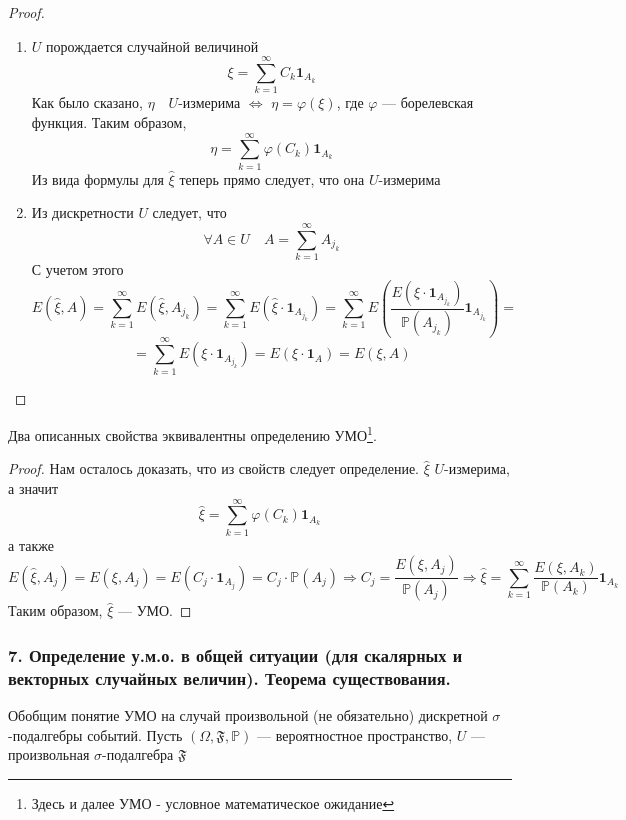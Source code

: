 \documentclass[12pt, russian]{article}
\begin{document}
\begin{proof}
$ $
\begin{enumerate}
\item
$U$ порождается случайной величиной 
$$ \xi = \sum\limits_{k=1}^{\infty}{C_k \mathbf{1}_{A_k}}$$
Как было сказано, $\eta\quad U$-измерима $\Leftrightarrow$ $\eta = \varphi(\xi)$, где $\varphi$ --- борелевская функция. Таким образом,
$$ \eta = \sum\limits_{k=1}^{\infty}{\varphi(C_k) \mathbf{1}_{A_k}} $$
Из вида формулы для $\hat{\xi}$ теперь прямо следует, что она $U$-измерима
\item Из дискретности $U$ следует, что
$$ \forall A \in U \quad A = \sum\limits_{k=1}^{\infty}{A_{j_k}} $$
С учетом этого
$$ E(\hat{\xi}, A) = \sum\limits_{k=1}^{\infty}{E(\hat{\xi}, A_{j_k})} = \sum\limits_{k=1}^{\infty}{E(\hat{\xi}\cdot\mathbf{1}_{A_{j_k}})} = \sum\limits_{k=1}^{\infty}{E\left( \frac{E(\xi\cdot\mathbf{1}_{A_{j_k}})}{\mathbb{P}(A_{j_k})} \mathbf{1}_{A_{j_k}} \right)} = $$ 
$$ = \sum\limits_{k=1}^{\infty}{E(\xi\cdot\mathbf{1}_{A_{j_k}})} = E(\xi \cdot \mathbf{1}_A) = E(\xi, A) $$
\end{enumerate}
\end{proof}
\newpage
\begin{lemma}
Два описанных свойства эквивалентны определению УМО\footnote{Здесь и далее УМО - условное математическое ожидание}.
\end{lemma}
\begin{proof}
Нам осталось доказать, что из свойств следует определение.
$\hat{\xi}$ $U$-измерима, а значит
$$ \hat{\xi} = \sum\limits_{k=1}^{\infty}{\varphi(C_k) \mathbf{1}_{A_k}} $$
а также
$$ E(\hat{\xi}, A_j) = E(\xi, A_j) = E(C_j\cdot\mathbf{1}_{A_j}) = C_j\cdot\mathbb{P}(A_j) \Longrightarrow C_j = \frac{E(\xi, A_j)}{\mathbb{P}(A_j)} \Longrightarrow \hat{\xi} = \sum\limits_{k=1}^{\infty}{\frac{E(\xi, A_k)}{\mathbb{P}(A_k)}\mathbf{1}_{A_k}} $$
Таким образом, $\hat{\xi}$ --- УМО.
\end{proof}

\newpage
\subsubsection*{7. Определение у.м.о. в общей ситуации (для скалярных и векторных случайных величин). Теорема существования.}

Обобщим понятие УМО на случай произвольной (не обязательно) дискретной $\sigma$-подалгебры событий.
\noindent Пусть $(\Omega, \mathfrak{F}, \mathbb{P})$ --- вероятностное пространство, $U$ --- произвольная $\sigma$-подалгебра $\mathfrak{F}$
\end{document}
